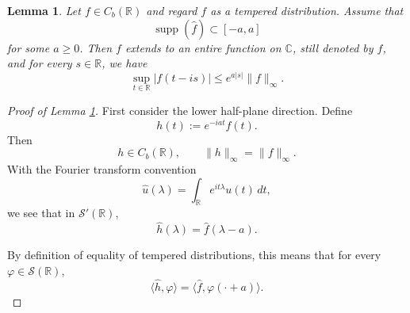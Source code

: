 \documentclass[10pt,a4paper]{amsart}
\newtheorem{lem}{Lemma}
\begin{document}
\begin{lem}\label{lem FT cpt supp}
Let $f\in C_b(\mathbb R)$ and regard $f$ as a tempered distribution. Assume that
\[
\operatorname{supp}(\widehat{f})\subset [-a,a]
\]
for some $a\ge 0$. Then $f$ extends to an entire function on $\mathbb C$, still
denoted by $f$, and for every $s\in \mathbb{R}$, we have
\[
\sup_{t\in\mathbb R}|f(t-is)|\le e^{a|s|}\|f\|_\infty.
\]
\end{lem}

\begin{proof}[Proof of Lemma \ref{lem FT cpt supp}]
First consider the lower half-plane direction. Define
\[
        h(t):=e^{-iat}f(t).
\]
Then
\[
        h\in C_b(\mathbb R),
        \qquad
        \|h\|_\infty=\|f\|_\infty.
\]
With the Fourier transform convention
\[
        \widehat u(\lambda)
        =
        \int_{\mathbb R}e^{it\lambda}u(t)\,dt,
\]
we see that in \(\mathcal S'(\mathbb R)\),
\[
        \widehat h(\lambda)
        =
        \widehat f(\lambda-a).
\]

By definition of equality of tempered distributions, this means that for every
\(\varphi\in\mathcal S(\mathbb R)\),
\[
        \langle \widehat h,\varphi\rangle
        =
        \langle \widehat f,\varphi(\cdot+a)\rangle .
\]


\end{proof}
\end{document}

